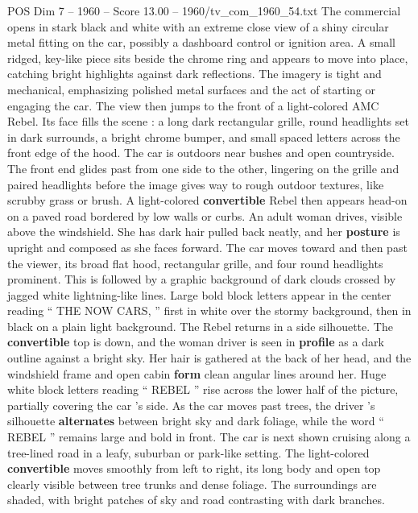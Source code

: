 \begin{textsample}{POS Dim 7 – 1960 – Score 13.00 – 1960/tv\_com\_1960\_54.txt}  \label{ex:f7_pos_023}
The commercial opens in stark black and white with an extreme close view of a shiny circular metal fitting on the car, possibly a dashboard control or ignition area.
A small ridged, key-like piece sits beside the chrome ring and appears to move into place, catching bright highlights against dark reflections.
The imagery is tight and mechanical, emphasizing polished metal surfaces and the act of starting or engaging the car.
The view then jumps to the front of a light-colored AMC Rebel.
Its face fills the scene : a long dark rectangular grille, round headlights set in dark surrounds, a bright chrome bumper, and small spaced letters across the front edge of the hood.
The car is outdoors near bushes and open countryside.
The front end glides past from one side to the other, lingering on the grille and paired headlights before the image gives way to rough outdoor textures, like scrubby grass or brush.
A light-colored \textbf{convertible} Rebel then appears head-on on a paved road bordered by low walls or curbs.
An adult woman drives, visible above the windshield.
She has dark hair pulled back neatly, and her \textbf{posture} is upright and composed as she faces forward.
The car moves toward and then past the viewer, its broad flat hood, rectangular grille, and four round headlights prominent.
This is followed by a graphic background of dark clouds crossed by jagged white lightning-like lines.
Large bold block letters appear in the center reading “ THE NOW CARS, ” first in white over the stormy background, then in black on a plain light background.
The Rebel returns in a side silhouette.
The \textbf{convertible} top is down, and the woman driver is seen in \textbf{profile} as a dark outline against a bright sky.
Her hair is gathered at the back of her head, and the windshield frame and open cabin \textbf{form} clean angular lines around her.
Huge white block letters reading “ REBEL ” rise across the lower half of the picture, partially covering the car ’s side.
As the car moves past trees, the driver ’s silhouette \textbf{alternates} between bright sky and dark foliage, while the word “ REBEL ” remains large and bold in front.
The car is next shown cruising along a tree-lined road in a leafy, suburban or park-like setting.
The light-colored \textbf{convertible} moves smoothly from left to right, its long body and open top clearly visible between tree trunks and dense foliage.
The surroundings are shaded, with bright patches of sky and road contrasting with dark branches.

\end{textsample}
